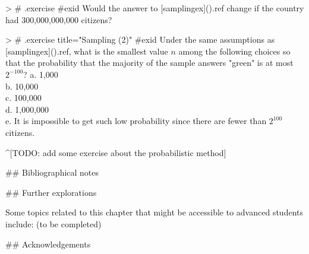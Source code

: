> # {.exercise  #exid}
Would the answer to [samplingex](){.ref}  change if the country had 300,000,000,000 citizens?

> # {.exercise title="Sampling (2)" #exid}
Under the same assumptions as [samplingex](){.ref}, what   is the smallest value $n$ among the following  choices so that the probability that the majority of the sample answers "green" is at most $2^{-100}$?
a. 1,000 \\
b. 10,000 \\
c. 100,000 \\
d. 1,000,000 \\
e. It is impossible to get such low probability since there are fewer than $2^{100}$ citizens.

^[TODO: add some exercise about the probabilistic method]

## Bibliographical notes


## Further explorations

Some topics related to this chapter that might be accessible to advanced students include: (to be completed)



## Acknowledgements

